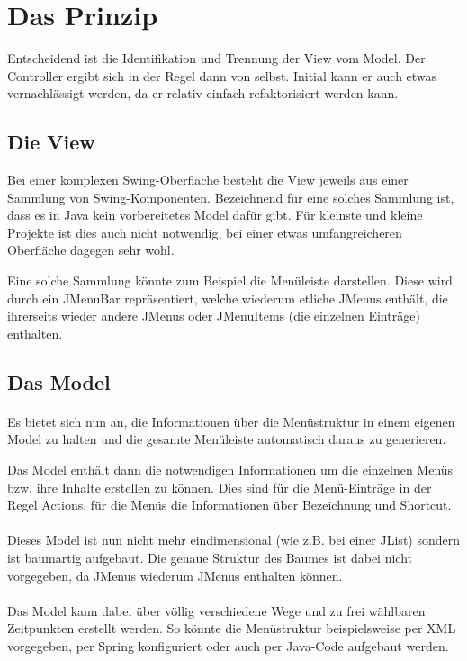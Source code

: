 \documentclass[oneside,a4paper]{scrartcl}
\begin{document}
\section{Das Prinzip}
Entscheidend ist die Identifikation und Trennung der View vom Model. Der Controller ergibt sich in der Regel dann
von selbst. Initial kann er auch etwas vernachlässigt werden, da er relativ einfach refaktorisiert werden kann.

\subsection{Die View}
Bei einer komplexen Swing-Oberfläche besteht die View jeweils aus einer Sammlung von Swing-Komponenten. 
Bezeichnend für eine solches Sammlung ist, dass es in Java kein vorbereitetes Model dafür gibt. Für kleinste und kleine Projekte
ist dies auch nicht notwendig, bei einer etwas umfangreicheren Oberfläche dagegen sehr wohl.

Eine solche Sammlung könnte zum Beispiel die Menüleiste darstellen. Diese wird durch ein JMenuBar repräsentiert, welche
wiederum etliche JMenus enthält, die ihrerseits wieder andere JMenus oder JMenuItems (die einzelnen Einträge)
enthalten.

\subsection{Das Model}
\paragraph{}
Es bietet sich nun an, die Informationen über die Menüstruktur in einem eigenen Model zu halten und die gesamte
Menüleiste automatisch daraus zu generieren.

Das Model enthält dann die notwendigen Informationen um die einzelnen Menüs bzw. ihre Inhalte erstellen zu können.
Dies sind für die Menü-Einträge in der Regel Actions, für die Menüs die Informationen über Bezeichnung und Shortcut.

\paragraph{}
Dieses Model ist nun nicht mehr eindimensional (wie z.B. bei einer JList) sondern ist baumartig aufgebaut.
Die genaue Struktur des Baumes ist dabei nicht vorgegeben, da JMenus wiederum JMenus enthalten können.

\paragraph{}
Das Model kann dabei über völlig verschiedene Wege und zu frei wählbaren Zeitpunkten erstellt werden. So könnte die
Menüstruktur beispielsweise per XML vorgegeben, per Spring konfiguriert oder auch per Java-Code aufgebaut werden.
\end{document}
